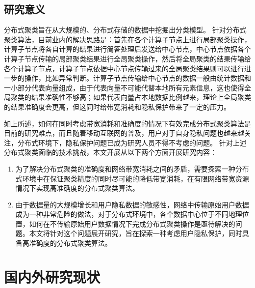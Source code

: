\subsection{研究意义}
分布式聚类旨在从大规模的、分布式存储的数据中挖掘出分类模型。
针对分布式聚类算法，目前业内的解决思路是：首先在各个计算子节点上进行局部聚类操作，计算子节点将各自计算的结果进行简答处理后发送给中心节点，中心节点依据各个计算子节点传输的局部聚类结果进行全局聚类操作，然后将全局聚类的结果传输给各个计算子节点，计算子节点依据中心节点传输过来的全局聚类结果则可以进行进一步的操作，比如异常判断。计算子节点传输给中心节点的数据一般由统计数据和一小部分代表向量组成，由于代表向量不可能代替本地所有元素信息，这也使得全局聚类的结果准确性不够高；如果代表向量占本地数据比例越来，理论上全局聚类的结果准确度会更高，但这同时给带宽消耗和隐私保护带来了一定的压力。

如上所述，如何在同时考虑带宽消耗和准确度的情况下有效完成分布式聚类算法是目前的研究难点，而且随着移动互联网的普及，用户对于自身隐私问题也越来越关注，分布式环境下，隐私保护问题已成为研究人员不得不考虑的问题。
针对上述分布式聚类面临的技术挑战，本文开展从以下两个方面开展研究内容：
\begin{enumerate}
\item 为了解决分布式聚类的准确度和网络带宽消耗之间的矛盾，需要探索一种分布式环境中在保证聚类精度的同时尽可能的降低带宽消耗，在有限网络带宽资源情况下实现高准确度的分布式聚类算法。
\item 由于数据量的大规模增长和用户隐私数据的敏感性，网络中传输原始用户数据成为一种非常危险的做法，对于分布式环境中，各个数据中心位于不同地理位置，如何在不传输原始用户数据情况下完成分布式聚类操作是亟待解决的问题。本文将针对这个问题展开研究，旨在探索一种考虑用户隐私保护，同时具备高准确度的分布式聚类算法。
\end{enumerate}


\section{国内外研究现状}


